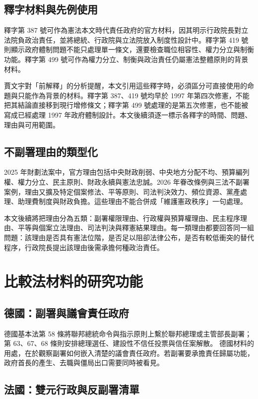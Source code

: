 \documentclass[12pt]{ctexart}
\begin{document}
\subsection{釋字材料與先例使用}

釋字第 387 號可作為憲法本文時代責任政府的官方材料，因其明示行政院長對立法院負政治責任，並將總統、行政院與立法院放入制度性設計中。釋字第 419 號則顯示政府體制問題不能只處理單一條文，還要檢查職位相容性、權力分立與制衡功能。釋字第 499 號可作為權力分立、制衡與政治責任仍屬憲法整體原則的背景材料。

賈文宇對「前解釋」的分析提醒，本文引用這些釋字時，必須區分可直接使用的命題與只能作為背景的材料。釋字第 387、419 號均早於 1997 年第四次修憲，不能把其結論直接移到現行增修條文；釋字第 499 號處理的是第五次修憲，也不能被寫成已經處理 1997 年政府體制設計。本文後續須逐一標示各釋字的時間、問題、理由與可用範圍。

\subsection{不副署理由的類型化}

2025 年財劃法案中，官方理由包括中央財政削弱、中央地方分配不均、預算編列權、權力分立、民主原則、財政永續與憲法忠誠。2026 年眷改條例與三法不副署案例，理由又擴及特定個案修法、平等原則、司法判決效力、頻位資源、黨產處理、助理費制度與財政負擔。這些理由不能合併成「維護憲政秩序」一句處理。

本文後續將把理由分為五類：副署權限理由、行政權與預算權理由、民主程序理由、平等與個案立法理由、司法判決與釋憲結果理由。每一類理由都要回答同一組問題：該理由是否具有憲法位階，是否足以阻卻法律公布，是否有較低衝突的替代程序，行政院長提出該理由後需承擔何種政治責任。

\section{比較法材料的研究功能}

\subsection{德國：副署與議會責任政府}

德國基本法第 58 條將聯邦總統命令與指示原則上繫於聯邦總理或主管部長副署；第 63、67、68 條則安排總理選任、建設性不信任投票與信任案解散。\autocite{germany_basic_law} 德國材料的用處，在於觀察副署如何嵌入清楚的議會責任政府。若副署要承擔責任歸屬功能，政府首長的產生、去職與僵局出口需要同時被看見。

\subsection{法國：雙元行政與反副署清單}
\end{document}
